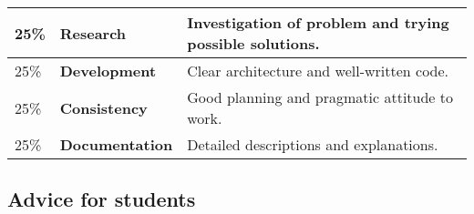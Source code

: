 \documentclass[12pt, a4paper]{article}
\begin{document}
\begin{center}
\begin{tabular}{llp{8.4cm}}
\toprule
25\% & \textbf{Research} & Investigation of problem and trying possible solutions. \\
\midrule
25\% & \textbf{Development} & Clear architecture and well-written code. \\
\midrule
25\% & \textbf{Consistency} & Good planning and pragmatic attitude to work. \\
\midrule
25\% & \textbf{Documentation} & Detailed descriptions and explanations. \\
\bottomrule
\end{tabular}
\end{center}

\subsection*{Advice for students}
\end{document}
